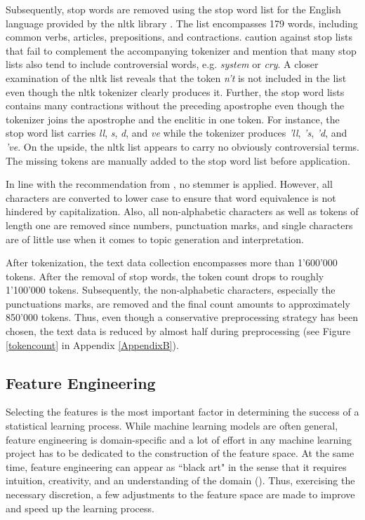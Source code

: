 \documentclass[11pt,a4paper,english,oneside]{book}
\numberwithin{equation}{chapter}
\begin{document}
Subsequently, stop words are removed using the stop word list for the English language provided by the nltk library \citep{Bird.2010}. The list encompasses 179 words, including common verbs, articles, prepositions, and contractions. \citet[pp. 8--9]{Nothman.2018} caution against stop lists that fail to complement the accompanying tokenizer and mention that many stop lists also tend to include controversial words, e.g. \textit{system} or \textit{cry}. A closer examination of the nltk list reveals that the token \textit{n't} is not included in the list even though the nltk tokenizer clearly produces it. Further, the stop word lists contains many contractions without the preceding apostrophe even though the tokenizer joins the apostrophe and the enclitic in one token. For instance, the stop word list carries \textit{ll}, \textit{s}, \textit{d}, and \textit{ve} while the tokenizer produces \textit{'ll}, \textit{'s}, \textit{'d}, and \textit{'ve}. On the upside, the nltk list appears to carry no obviously controversial terms. The missing tokens are manually added to the stop word list before application. 

In line with the recommendation from \cite{Schofield.2017}, no stemmer is applied. However, all characters are converted to lower case to ensure that word equivalence is not hindered by capitalization. Also, all non-alphabetic characters as well as tokens of length one are removed since numbers, punctuation marks, and single characters are of little use when it comes to topic generation and interpretation. 

After tokenization, the text data collection encompasses more than 1'600'000 tokens. After the removal of stop words, the token count drops to roughly 1'100'000 tokens. Subsequently, the non-alphabetic characters, especially the punctuations marks, are removed and the final count amounts to approximately 850'000 tokens. Thus, even though a conservative preprocessing strategy has been chosen, the text data is reduced by almost half during preprocessing (see Figure \ref{tokencount} in Appendix \ref{AppendixB}).

\subsection{Feature Engineering}\label{featueeng}
Selecting the features is the most important factor in determining the success of a statistical learning process. While machine learning models are often general, feature engineering is domain-specific and a lot of effort in any machine learning project has to be dedicated to the construction of the feature space. At the same time, feature engineering can appear as ``black art" in the sense that it requires intuition, creativity, and an understanding of the domain (\citealp{Domingos.2012}). Thus, exercising the necessary discretion, a few adjustments to the feature space are made to improve and speed up the learning process. 
\end{document}
